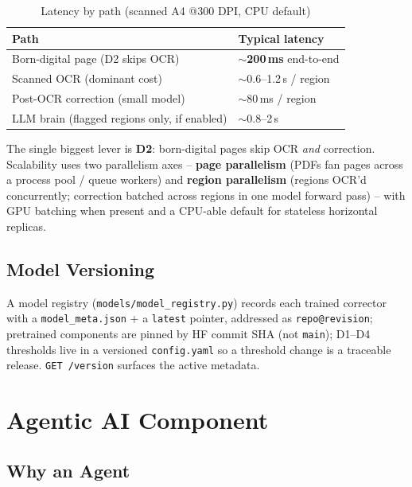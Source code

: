 \documentclass[12pt,a4paper]{article}
\begin{document}
\begin{table}[H]
\centering
\caption{Latency by path (scanned A4 @300 DPI, CPU default)}
\begin{tabular}{ll}
\toprule
\textbf{Path} & \textbf{Typical latency} \\
\midrule
Born-digital page (D2 skips OCR) & $\sim$\textbf{200\,ms} end-to-end \\
Scanned OCR (dominant cost) & $\sim$0.6--1.2\,s / region \\
Post-OCR correction (small model) & $\sim$80\,ms / region \\
LLM brain (flagged regions only, if enabled) & $\sim$0.8--2\,s \\
\bottomrule
\end{tabular}
\end{table}

The single biggest lever is \textbf{D2}: born-digital pages skip OCR \emph{and} correction. Scalability uses two parallelism axes -- \textbf{page parallelism} (PDFs fan pages across a process pool / queue workers) and \textbf{region parallelism} (regions OCR'd concurrently; correction batched across regions in one model forward pass) -- with GPU batching when present and a CPU-able default for stateless horizontal replicas.

\subsection{Model Versioning}

A model registry (\texttt{models/model\_registry.py}) records each trained corrector with a \texttt{model\_meta.json} + a \texttt{latest} pointer, addressed as \texttt{repo@revision}; pretrained components are pinned by HF commit SHA (not \texttt{main}); D1--D4 thresholds live in a versioned \texttt{config.yaml} so a threshold change is a traceable release. \texttt{GET /version} surfaces the active metadata.

\section{Agentic AI Component}

\subsection{Why an Agent}
\end{document}
